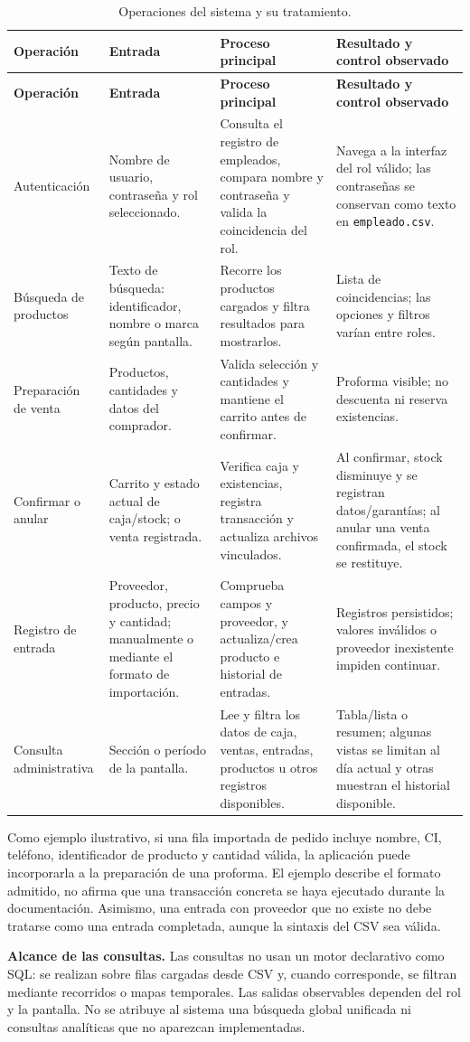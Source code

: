 \begin{longtable}{|p{2.2cm}|p{2.75cm}|p{3.15cm}|p{5.05cm}|}
\caption{Operaciones del sistema y su tratamiento.}
\label{tab:operaciones}\\
\hline
\textbf{Operación} & \textbf{Entrada} & \textbf{Proceso principal} & \textbf{Resultado y control observado}\\
\hline
\endfirsthead
\hline
\textbf{Operación} & \textbf{Entrada} & \textbf{Proceso principal} & \textbf{Resultado y control observado}\\
\hline
\endhead
Autentica\-ción & Nombre de usuario, contraseña y rol seleccionado. & Consulta el registro de empleados, compara nombre y contraseña y valida la coincidencia del rol. & Navega a la interfaz del rol válido; las contraseñas se conservan como texto en \texttt{empleado.csv}.\\
\hline
Búsqueda de productos & Texto de búsqueda: identificador, nombre o marca según pantalla. & Recorre los productos cargados y filtra resultados para mostrarlos. & Lista de coincidencias; las opciones y filtros varían entre roles.\\
\hline
Preparación de venta & Productos, cantidades y datos del comprador. & Valida selección y cantidades y mantiene el carrito antes de confirmar. & Proforma visible; no descuenta ni reserva existencias.\\
\hline
Confirmar o anular & Carrito y estado actual de caja/stock; o venta registrada. & Verifica caja y existencias, registra transacción y actualiza archivos vinculados. & Al confirmar, stock disminuye y se registran datos/garantías; al anular una venta confirmada, el stock se restituye.\\
\hline
Registro de entrada & Proveedor, producto, precio y cantidad; manualmente o mediante el formato de importación. & Comprueba campos y proveedor, y actualiza/crea producto e historial de entradas. & Registros persistidos; valores inválidos o proveedor inexistente impiden continuar.\\
\hline
Consulta administrativa & Sección o período de la pantalla. & Lee y filtra los datos de caja, ventas, entradas, productos u otros registros disponibles. & Tabla/lista o resumen; algunas vistas se limitan al día actual y otras muestran el historial disponible.\\
\hline
\end{longtable}

Como ejemplo ilustrativo, si una fila importada de pedido incluye nombre, CI, teléfono, identificador de producto y cantidad válida, la aplicación puede incorporarla a la preparación de una proforma. El ejemplo describe el formato admitido, no afirma que una transacción concreta se haya ejecutado durante la documentación. Asimismo, una entrada con proveedor que no existe no debe tratarse como una entrada completada, aunque la sintaxis del CSV sea válida.

\textbf{Alcance de las consultas.} Las consultas no usan un motor declarativo como SQL: se realizan sobre filas cargadas desde CSV y, cuando corresponde, se filtran mediante recorridos o mapas temporales. Las salidas observables dependen del rol y la pantalla. No se atribuye al sistema una búsqueda global unificada ni consultas analíticas que no aparezcan implementadas.
